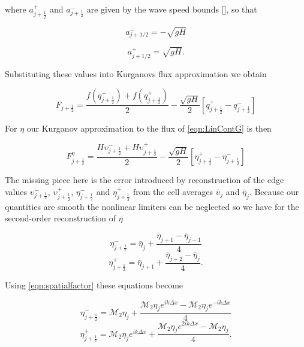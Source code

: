 where $a^+_{j+\frac{1}{2}}$ and $a^-_{j+\frac{1}{2}}$ are given by the wave speed bounds [], so that 

\[a^-_{j+ 1/2} =  - \sqrt{g H}\]

\[a^+_{j+ 1/2} = \sqrt{g H}.\]

Substituting these values into Kurganovs flux approximation we obtain 

\begin{equation}\label{eqn:HLL_fluxred}
F_{j+\frac{1}{2}} = \dfrac{ f\left(q^-_{j+\frac{1}{2}}\right) + f\left(q^+_{j+\frac{1}{2}}\right)}{ 2}  - \dfrac{ \sqrt{gH}}{ 2} \left [ q^+_{j+\frac{1}{2}} - q^-_{j+\frac{1}{2}} \right ]
\end{equation}

For $\eta$ our Kurganov approximation to the flux of \eqref{eqn:LinContG} is then


\begin{equation}
\label{eqn:HLL_fluxeta}
F^{\eta}_{j+\frac{1}{2}} = \dfrac{ H \upsilon ^-_{j+\frac{1}{2}}+ H \upsilon ^+_{j+\frac{1}{2}}}{ 2}  - \dfrac{ \sqrt{gH}}{ 2} \left [ \eta^+_{j+\frac{1}{2}} - \eta^-_{j+\frac{1}{2}} \right ]
\end{equation}

The missing piece here is the error introduced by reconstruction of the edge values $\upsilon ^-_{j+\frac{1}{2}}$, $\upsilon ^+_{j+\frac{1}{2}}$, $\eta ^-_{j+\frac{1}{2}}$ and $\eta ^+_{j+\frac{1}{2}}$ from the cell averages $\bar{\upsilon}_j$ and $\bar{\eta}_j$. Because our quantities are smooth the nonlinear limiters can be neglected so we have for the second-order reconstruction of $\eta$ 


	\begin{equation*}
	\eta^-_{j+\frac{1}{2}} = \bar{\eta}_j + \frac{\bar{\eta}_{j+ 1} - \bar{\eta}_{j - 1}}{4}
	\end{equation*}
	\begin{equation*}
	\eta^+_{j+\frac{1}{2}} = \bar{\eta}_{j+1} + \frac{\bar{\eta}_{j+ 2} - \bar{\eta}_{j}}{4}.
	\end{equation*}
	

Using \eqref{eqn:spatialfactor} these equations become


	\begin{equation*}
	\eta^-_{j+\frac{1}{2}} = \mathcal{M}_2{\eta}_j + \frac{\mathcal{M}_2{\eta}_{j} e^{ik\Delta x} - \mathcal{M}_2{\eta}_{j} e^{-ik\Delta x}}{4}
	\end{equation*}
	\begin{equation*}
	\eta^+_{j+\frac{1}{2}} = \mathcal{M}_2{\eta}_{j}e^{ik\Delta x} + \frac{\mathcal{M}_2{\eta}_{j}e^{2ik\Delta x} - \mathcal{M}_2{\eta}_{j}}{4}.
	\end{equation*}


